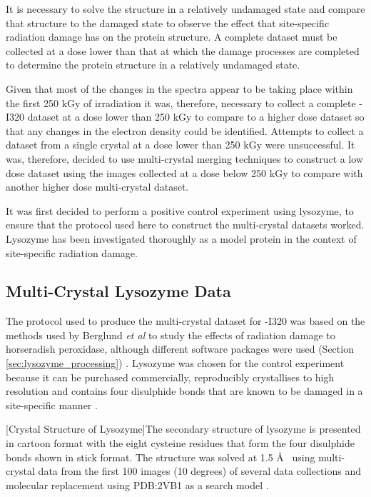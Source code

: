 It is necessary to solve the structure in a relatively undamaged state and compare that structure to the damaged state to observe the effect that site-specific radiation damage has on the protein structure. A complete dataset must be collected at a dose lower than that at which the damage processes are completed to determine the protein structure in a relatively undamaged state.

Given that most of the changes in the spectra appear to be taking place within the first 250 kGy of irradiation it was, therefore, necessary to collect a complete \atpdx -I320 dataset at a dose lower than 250 kGy to compare to a higher dose dataset so that any changes in the electron density could be identified. Attempts to collect a dataset from a single crystal at a dose lower than 250 kGy were unsuccessful. It was, therefore, decided to use multi-crystal merging techniques to construct a low dose dataset using the images collected at a dose below 250 kGy to compare with another higher dose multi-crystal dataset.

It was first decided to perform a positive control experiment using lysozyme, to ensure that the protocol used here to construct the multi-crystal datasets worked. Lysozyme has been investigated thoroughly as a model protein in the context of site-specific radiation damage.         

\subsection{Multi-Crystal Lysozyme Data}

The protocol used to produce the multi-crystal dataset for \atpdx -I320 was based on the methods used by Berglund \textit{et al} to study the effects of radiation damage to horseradish peroxidase, although different software packages were used (Section \ref{sec:lysozyme_processing}) \cite{Berglund2002}. Lysozyme was chosen for the control experiment because it can be purchased commercially, reproducibly crystallises to high resolution and contains four disulphide bonds that are known to be damaged in a site-specific manner \cite{Blake1965,Petrova2010,Sutton2013}. 

\begin{minipage}{\linewidth}
	[Crystal Structure of Lysozyme]{The secondary structure of lysozyme is presented in cartoon format with the eight cysteine residues that form the four disulphide bonds shown in stick format. The structure was solved at 1.5 \si{\angstrom}~ using multi-crystal data from the first 100 images (10 degrees) of several data collections and molecular replacement using PDB:2VB1 as a search model \cite{Wang2007}. \label{fig:Lysozyme}}		
\end{minipage}

